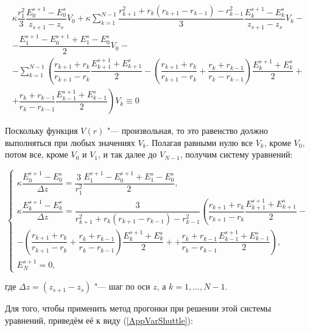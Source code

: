 \begin{equation}
\begin{array}{l}
\kappa\dfrac{r_1^2}{3}\dfrac{E_0^{s+1}-E_0^s}{z_{s+1}-z_s} V_0 +
\kappa\sum\limits_{k=1}^{N-1}\dfrac{r_{k+1}^2 + r_k(r_{k+1}-r_{k-1})-r_{k-1}^2}{3}\dfrac{E_k^{s+1}-E_k^s}{z_{s+1}-z_s} V_k - \\[1em]
-\dfrac{E_1^{s+1}-E_0^{s+1}+E_1^s-E_0^s}{2} V_0 -\\[1em]
-\sum\limits_{k=1}^{N-1}\left( \dfrac{r_{k+1}+r_k}{r_{k+1}-r_k}\dfrac{E_{k+1}^{s+1}+E_{k+1}^s}{2} -
\left(\dfrac{r_{k+1}+r_k}{r_{k+1}-r_k} + \dfrac{r_k+r_{k-1}}{r_k-r_{k-1}} \right)\dfrac{E_k^{s+1}+E_k^s}{2} + \right. \\[1em]
\left. + \dfrac{r_k+r_{k-1}}{r_k-r_{k-1}}\dfrac{E_{k-1}^{s+1}+E_{k-1}^s}{2}\right) V_k \equiv 0
\end{array}
\end{equation}

Поскольку функция $V(r)$ "--- произвольная, то это равенство должно выполняться при любых значениях $V_k$.
Полагая равными нулю все $V_k$, кроме $V_0$, потом все, кроме $V_0$ и $V_1$, и так далее до $V_{N-1}$, получим систему уравнений:

\begin{equation}\label{AppVarRFinalSystem}
\left\{
\begin{array}{l}
	\kappa \dfrac{E_0^{s+1} - E_0^s}{\Delta z} = \dfrac{3}{r_1^2} \dfrac{E_1^{s+1}-E_0^{s+1}+E_1^s-E_0^s}{2}, \\[1em]

	\kappa \dfrac{E_k^{s+1} - E_k^s}{\Delta z} = \dfrac{3}{r_{k+1}^2 + r_k(r_{k+1}-r_{k-1})-r_{k-1}^2}\left(
	\dfrac{r_{k+1}+r_k}{r_{k+1}-r_k}\dfrac{E_{k+1}^{s+1}+E_{k+1}^s}{2} - \right.\\[1em]
	- \left(\dfrac{r_{k+1}+r_k}{r_{k+1}-r_k} + \dfrac{r_k+r_{k-1}}{r_k-r_{k-1}} \right)\dfrac{E_k^{s+1}+E_k^s}{2} +
    \left. + \dfrac{r_k+r_{k-1}}{r_k-r_{k-1}}\dfrac{E_{k-1}^{s+1}+E_{k-1}^s}{2}\right), \\[1em]

	E_N^{s+1} = 0,
\end{array}
\right.
\end{equation}

\noindent где $\Delta z = (z_{s+1} - z_s)$ "--- шаг по оси $z$, а $k = 1, \ldots, N-1$.

Для того, чтобы применить метод прогонки при решении этой системы уравнений, приведём её к виду (\ref{AppVarShuttle}):

